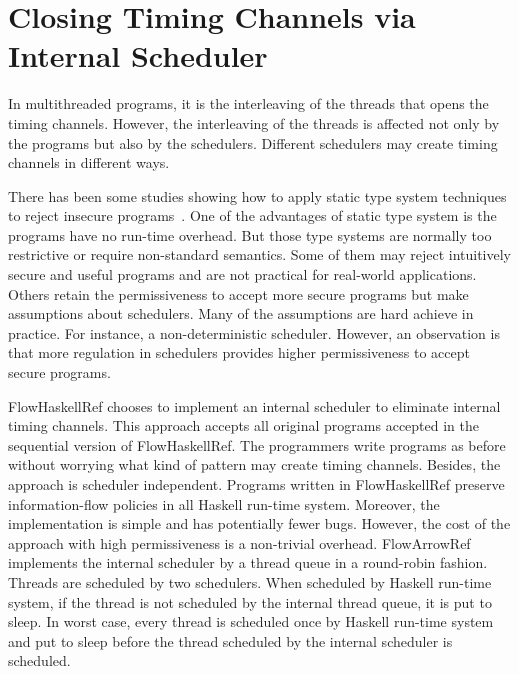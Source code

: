 \documentclass{report}
\begin{document}
\section{Closing Timing Channels via Internal Scheduler}
In multithreaded programs, it is the interleaving of the threads that opens the timing channels. 
However, the interleaving of the threads is affected not only by the programs but also by the schedulers.
Different schedulers may create timing channels in different ways.

There has been some studies showing how to apply static type system techniques to reject insecure
programs~\cite{Castellani:Boudol:TCS02,Volpano:Smith:Probabilistic,Zdancewic:Myers:CSFW03}. 
One of the advantages of static type system is the programs have no run-time overhead.
But those type systems are normally too restrictive or require non-standard semantics. 
Some of them may reject intuitively secure and useful programs and are not practical for
real-world applications.
Others retain the permissiveness to accept more secure programs but make assumptions about schedulers. 
Many of the assumptions are hard achieve in practice. For instance, a non-deterministic scheduler.
However, an observation is that more regulation in schedulers provides higher permissiveness to accept secure
programs.

FlowHaskellRef chooses to implement an internal scheduler to eliminate internal timing channels.
This approach accepts all original programs accepted in the sequential version of FlowHaskellRef. The programmers
write programs as before without worrying what kind of pattern may create timing channels.
Besides, the approach is scheduler independent. Programs written in FlowHaskellRef preserve
information-flow policies in all Haskell run-time system.
Moreover, the implementation is simple and has potentially fewer bugs.
However, the cost of the approach with high permissiveness is a non-trivial overhead. 
FlowArrowRef implements the internal scheduler by a thread queue in a round-robin fashion. 
Threads are scheduled by two schedulers. When scheduled by Haskell run-time system, if
the thread is not scheduled by the internal thread queue, it is put to sleep. 
In worst case, every thread is scheduled once by Haskell run-time system and put to sleep before the thread
scheduled by the internal scheduler is scheduled.
\end{document}
